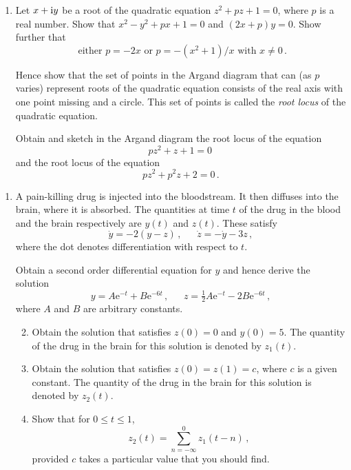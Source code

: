 \documentclass[a4, 11pt]{report}
\newlength{\qspace}
\newcounter{qnumber}
\newenvironment{question}%
 {\vspace{\qspace}
  \begin{enumerate}[\bfseries 1\quad][10]%
    \setcounter{enumi}{\value{qnumber}}%
    \item%
 }
{
  \end{enumerate}
  \filbreak
  \stepcounter{qnumber}
 }
\newenvironment{questionparts}[1][1]%
 {
  \begin{enumerate}[\bfseries (i)]%
    \setcounter{enumii}{#1}
    \addtocounter{enumii}{-1}
    \setlength{\itemsep}{5mm}
    \setlength{\parskip}{8pt}
 }
 {
  \end{enumerate}
 }
\def\e{{\mathrm e}}
\def\le{\leqslant}
\begin{document}
\begin{question}
Let  $x+{\rm i} y$ be a root of 
the quadratic equation $z^2 + pz +1=0$, where 
$p$ is a real number. Show that $x^2-y^2 +px+1=0$ and $(2x+p)y=0$.
Show further that 
\[
\text{\ either \ } p=-2x \text{ \ \ or \ \ } p=-(x^2+1)/x \text{ \ with  \ }
x\ne0 \,.
\]

Hence show that the set of  points in the Argand diagram 
that can (as $p$ varies)
represent roots 
of the quadratic equation consists of the real axis with
one point missing and a circle.
This set of points is called
the {\em root locus} of the 
quadratic equation.

Obtain and sketch in the Argand diagram the root locus of the
equation
\[
pz^2 +z+1=0\,
\]
and the root locus of the equation
\[
pz^2 + p^2z +2=0\,.
\]
\end{question}
	
\begin{question}
A pain-killing drug is injected into the bloodstream. It 
then diffuses into the brain, where it is absorbed. 
The quantities at time $t$ of the drug in the blood
and the brain respectively are $y(t)$
and $z(t)$.  These satisfy 
\[
\dot y = - 2(y-z)\,, 
\ \ \ \ \ \ \ 
\dot z = - \dot y -3z\, ,
\]
where the dot denotes differentiation with respect to $t$.

Obtain a second order differential equation for $y$ and hence derive
the solution
\[
y= A\e^{-t} + B\e ^{-6t}\,,
\ \ \ \ \ \ \
z= \tfrac12 A \e^{-t} - 2 B \e^{-6t}\,,
\] 
where $A$ and $B$ are arbitrary constants.


\begin{questionparts}
\item Obtain the solution that satisfies 
$z(0)=0$ and $y(0)=  5$. The quantity
of the drug in the brain for this solution is
denoted by $z_1(t)$.

\item Obtain the  solution that satisfies
$ 
z(0)=z(1)= c$,
where $c$ is a given constant.
 The quantity
of the drug in the brain for this solution is
denoted by $z_2(t)$.

\item Show that for $0\le t \le 1$, 
\[
z_2(t) = \sum _{n=-\infty}^{0} z_1(t-n)\,,
\]
provided $c$ takes a particular value that you should find.

 
\end {questionparts}
\end{question}
		
\end{document}
